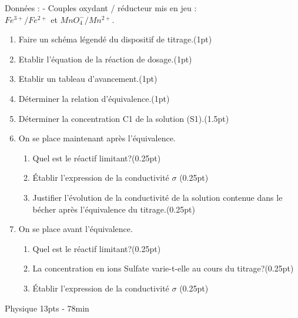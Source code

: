 \documentclass[12pt]{article}
\begin{document}
Données : - Couples oxydant / réducteur mis en jeu :\\ $Fe^{3+}/Fe^{2+}$ et $MnO_4^-/Mn^{2+}$.
\begin{enumerate}
  \item  Faire un schéma légendé du dispositif de titrage.\dotfill(1pt)
  \item Etablir l’équation de la réaction de dosage.\dotfill(1pt)
  \item Etablir un tableau d’avancement.\dotfill(1pt)
  \item Déterminer la relation d’équivalence.\dotfill(1pt)
  \item Déterminer la concentration C1 de la solution (S1).\dotfill(1.5pt)
  \item  On se place maintenant après l'équivalence.
    \begin{enumerate}
      \item  Quel est le réactif limitant?\dotfill(0.25pt)

      \item  Établir l'expression de la conductivité $\sigma$ \dotfill(0.25pt)

   \item Justifier l'évolution de la conductivité de la solution
     contenue dans le bécher après l'équivalence du titrage.\dotfill(0.25pt)
    \end{enumerate}

  \item  On se place avant l'équivalence.
    \begin{enumerate}
      \item  Quel est le réactif limitant?\dotfill(0.25pt)

      \item  La concentration en ions Sulfate  varie-t-elle au cours du
        titrage?\dotfill(0.25pt)
       
      \item  Établir l'expression de la conductivité $\sigma$ \dotfill(0.25pt)

    \end{enumerate}
\end{enumerate}

\begin{center}
    \vspace{3.5cm}
\hrulefill
\Large{Physique 13pts - 78min}
\hrulefill\\
\end{center}
\end{document}
